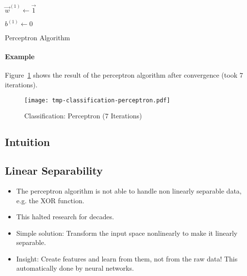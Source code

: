		\begin{algorithm}
			\( \vec{w}^{(1)} \gets \vec{1} \)

			\( b^{(1)} \gets 0 \)


			\caption{Perceptron Algorithm}
			\label{alg:perceptron}
		\end{algorithm}

		\paragraph{Example}
			Figure~\ref{fig:perceptronExample} shows the result of the perceptron algorithm after convergence (took \(7\) iterations).

			\begin{figure}
				\centering
				\texttt{[image: tmp-classification-perceptron.pdf]}
				\caption{Classification: Perceptron (\(7\) Iterations)}
				\label{fig:perceptronExample}
			\end{figure}

		\subsection{Intuition} %

		\subsection{Linear Separability}
			\begin{itemize}
				\item The perceptron algorithm is not able to handle non linearly separable data, e.g. the XOR function.
				\item This halted research for decades.
				\item Simple solution: Transform the input space nonlinearly to make it linearly separable.
				\item Insight: Create features and learn from them, not from the raw data! This automatically done by neural networks.
			\end{itemize}

